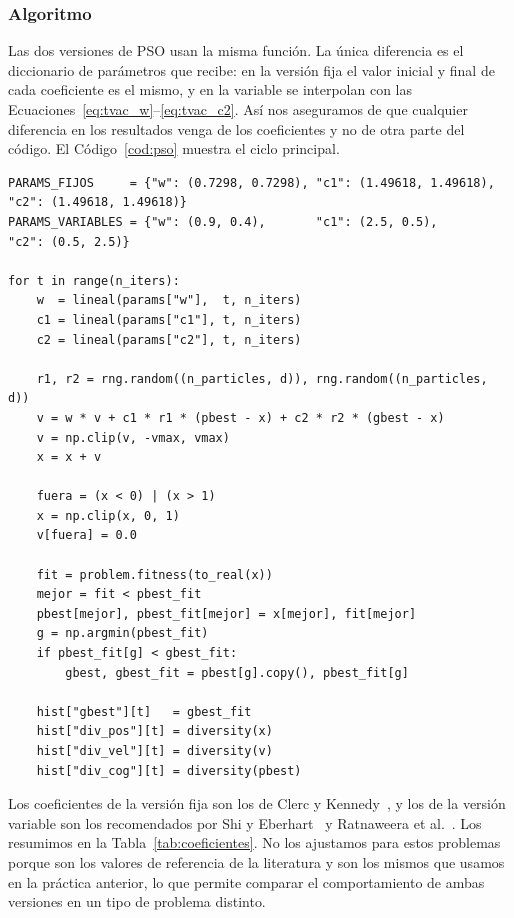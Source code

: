 \subsubsection{Algoritmo}

Las dos versiones de PSO usan la misma función. La única diferencia es el diccionario de parámetros que recibe: en la versión fija el valor inicial y final de cada coeficiente es el mismo, y en la variable se interpolan con las Ecuaciones~\eqref{eq:tvac_w}--\eqref{eq:tvac_c2}. Así nos aseguramos de que cualquier diferencia en los resultados venga de los coeficientes y no de otra parte del código. El Código~\ref{cod:pso} muestra el ciclo principal.

\begin{lstlisting}[caption={Ciclo principal de PSO (fragmento).}, label={cod:pso}]
PARAMS_FIJOS     = {"w": (0.7298, 0.7298), "c1": (1.49618, 1.49618), "c2": (1.49618, 1.49618)}
PARAMS_VARIABLES = {"w": (0.9, 0.4),       "c1": (2.5, 0.5),         "c2": (0.5, 2.5)}

for t in range(n_iters):
    w  = lineal(params["w"],  t, n_iters)
    c1 = lineal(params["c1"], t, n_iters)
    c2 = lineal(params["c2"], t, n_iters)

    r1, r2 = rng.random((n_particles, d)), rng.random((n_particles, d))
    v = w * v + c1 * r1 * (pbest - x) + c2 * r2 * (gbest - x)
    v = np.clip(v, -vmax, vmax)
    x = x + v

    fuera = (x < 0) | (x > 1)
    x = np.clip(x, 0, 1)
    v[fuera] = 0.0

    fit = problem.fitness(to_real(x))
    mejor = fit < pbest_fit
    pbest[mejor], pbest_fit[mejor] = x[mejor], fit[mejor]
    g = np.argmin(pbest_fit)
    if pbest_fit[g] < gbest_fit:
        gbest, gbest_fit = pbest[g].copy(), pbest_fit[g]

    hist["gbest"][t]   = gbest_fit
    hist["div_pos"][t] = diversity(x)
    hist["div_vel"][t] = diversity(v)
    hist["div_cog"][t] = diversity(pbest)
\end{lstlisting}

Los coeficientes de la versión fija son los de Clerc y Kennedy~\cite{clerc2002particle}, y los de la versión variable son los recomendados por Shi y Eberhart~\cite{shi1999empirical} y Ratnaweera et al.~\cite{ratnaweera2004self}. Los resumimos en la Tabla~\ref{tab:coeficientes}. No los ajustamos para estos problemas porque son los valores de referencia de la literatura y son los mismos que usamos en la práctica anterior, lo que permite comparar el comportamiento de ambas versiones en un tipo de problema distinto.

